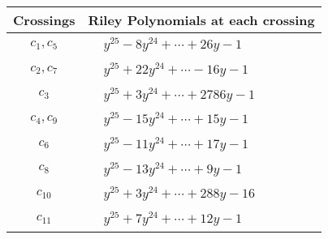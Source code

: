 \documentclass[1p]{elsarticle_modified}
\theoremstyle{definition}
\begin{document}
\begin{tabular}{m{50pt}|m{274pt}}
Crossings & \hspace{64pt}Riley Polynomials at each crossing \\
\hline $$\begin{aligned}c_{1},c_{5}\end{aligned}$$&$\begin{aligned}
&y^{25}-8 y^{24}+\cdots+26 y-1
\end{aligned}$\\
\hline $$\begin{aligned}c_{2},c_{7}\end{aligned}$$&$\begin{aligned}
&y^{25}+22 y^{24}+\cdots-16 y-1
\end{aligned}$\\
\hline $$\begin{aligned}c_{3}\end{aligned}$$&$\begin{aligned}
&y^{25}+3 y^{24}+\cdots+2786 y-1
\end{aligned}$\\
\hline $$\begin{aligned}c_{4},c_{9}\end{aligned}$$&$\begin{aligned}
&y^{25}-15 y^{24}+\cdots+15 y-1
\end{aligned}$\\
\hline $$\begin{aligned}c_{6}\end{aligned}$$&$\begin{aligned}
&y^{25}-11 y^{24}+\cdots+17 y-1
\end{aligned}$\\
\hline $$\begin{aligned}c_{8}\end{aligned}$$&$\begin{aligned}
&y^{25}-13 y^{24}+\cdots+9 y-1
\end{aligned}$\\
\hline $$\begin{aligned}c_{10}\end{aligned}$$&$\begin{aligned}
&y^{25}+3 y^{24}+\cdots+288 y-16
\end{aligned}$\\
\hline $$\begin{aligned}c_{11}\end{aligned}$$&$\begin{aligned}
&y^{25}+7 y^{24}+\cdots+12 y-1
\end{aligned}$\\
\hline
\end{tabular}\\~\\
\end{document}

